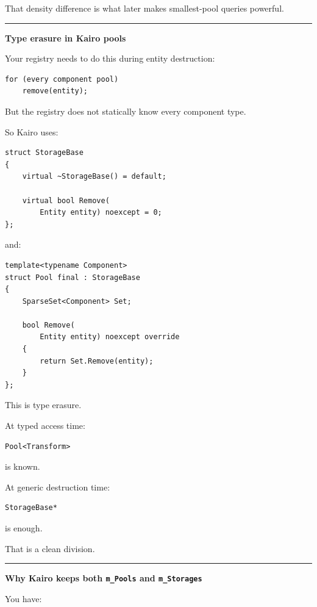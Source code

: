 That density difference is what later makes smallest-pool queries powerful.

\begin{center}\rule{0.5\linewidth}{0.5pt}\end{center}

\textbf{Type erasure in Kairo pools}

Your registry needs to do this during entity destruction:

\begin{verbatim}
for (every component pool)
    remove(entity);
\end{verbatim}

But the registry does not statically know every component type.

So Kairo uses:

\begin{verbatim}
struct StorageBase
{
    virtual ~StorageBase() = default;

    virtual bool Remove(
        Entity entity) noexcept = 0;
};
\end{verbatim}

and:

\begin{verbatim}
template<typename Component>
struct Pool final : StorageBase
{
    SparseSet<Component> Set;

    bool Remove(
        Entity entity) noexcept override
    {
        return Set.Remove(entity);
    }
};
\end{verbatim}

This is type erasure.

At typed access time:

\begin{verbatim}
Pool<Transform>
\end{verbatim}

is known.

At generic destruction time:

\begin{verbatim}
StorageBase*
\end{verbatim}

is enough.

That is a clean division.

\begin{center}\rule{0.5\linewidth}{0.5pt}\end{center}

\textbf{Why Kairo keeps both \texttt{m\_Pools} and \texttt{m\_Storages}}

You have:

